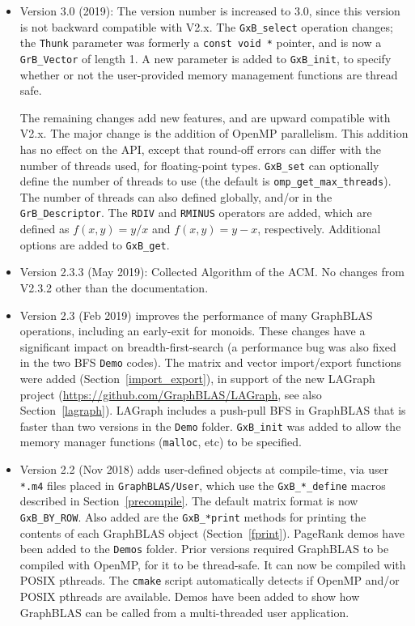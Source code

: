 \documentclass[12pt]{article}
\begin{document}
\begin{itemize}

\item Version 3.0 (2019):  The version number is increased to 3.0, since
this version is not backward compatible with V2.x.  The \verb'GxB_select'
operation changes; the \verb'Thunk' parameter was formerly a
\verb'const void *' pointer, and is now a \verb'GrB_Vector' of length 1.  A new
parameter is added to \verb'GxB_init', to specify whether or not the
user-provided memory management functions are thread safe.

The remaining changes add new features, and are upward compatible with V2.x.
The major change is the addition of OpenMP parallelism.  This addition has no
effect on the API, except that round-off errors can differ with the number of
threads used, for floating-point types.  \verb'GxB_set' can optionally define
the number of threads to use (the default is \verb'omp_get_max_threads').  The
number of threads can also defined globally, and/or in the
\verb'GrB_Descriptor'.  The \verb'RDIV' and \verb'RMINUS' operators are added,
which are defined as $f(x,y)=y/x$ and $f(x,y)=y-x$, respectively.  Additional
options are added to \verb'GxB_get'.

\item Version 2.3.3 (May 2019): Collected Algorithm of the ACM.
No changes from V2.3.2 other than the documentation.

\item Version 2.3 (Feb 2019) improves the performance of many GraphBLAS
operations, including an early-exit for monoids.  These changes have a
significant impact on breadth-first-search (a performance bug was also fixed in
the two BFS \verb'Demo' codes).  The matrix and vector import/export functions
were added (Section~\ref{import_export}), in support of the new LAGraph project
(\url{https://github.com/GraphBLAS/LAGraph}, see also Section~\ref{lagraph}).
LAGraph includes a push-pull BFS in GraphBLAS that is faster than two versions
in the \verb'Demo' folder.  \verb'GxB_init' was added to allow the memory
manager functions (\verb'malloc', etc) to be specified.

\item
Version 2.2 (Nov 2018)
adds user-defined objects at compile-time, via user \verb'*.m4' files placed in
\verb'GraphBLAS/User', which use the \verb'GxB_*_define' macros described in
Section~\ref{precompile}.  The default matrix format is now \verb'GxB_BY_ROW'.
Also added are the \verb'GxB_*print' methods for printing the contents of each
GraphBLAS object (Section~\ref{fprint}).   PageRank demos have been added to
the \verb'Demos' folder.
Prior versions required GraphBLAS to be compiled with OpenMP, for it to be
thread-safe.  It can now be compiled with POSIX pthreads.  The \verb'cmake'
script automatically detects if OpenMP and/or POSIX pthreads are available.
Demos have been added to show how GraphBLAS can be called from a multi-threaded
user application.


\end{itemize}
\end{document}
